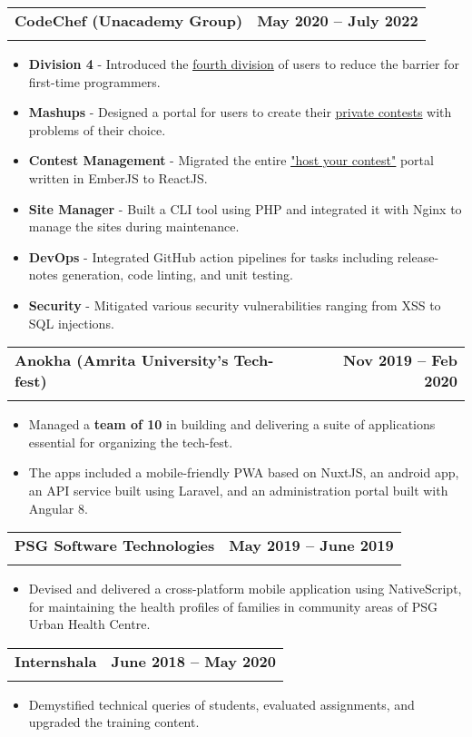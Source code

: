 \documentclass[letterpaper,11pt]{article}
\makeatletter
\newcommand{\resumeItem}[1]{
  \item\small{
    {#1 \vspace{-2pt}}
  }
}
\newcommand{\resumeSubheading}[4]{
  \vspace{-2pt}\item
    \begin{tabular*}{1.0\textwidth}[t]{l@{\extracolsep{\fill}}r}
      \textbf{#1} & \textbf{\small #2} \\
      \text{\small#3} & \text{\small #4} \\
    \end{tabular*}\vspace{-7pt}
}
\newcommand{\resumeItemListStart}{\begin{itemize}}
\newcommand{\resumeItemListEnd}{\end{itemize}\vspace{-5pt}}
\makeatother
\begin{document}
    \resumeSubheading
      {CodeChef (Unacademy Group)}{May 2020 -- July 2022}
      {Application Engineer $|$ Prev. Intern $|$ Tech : PHP,  Python,  ReactJS,  MySQL, SaltStack, AWS}{Bangalore, India}
      \resumeItemListStart
        \resumeItem{\textbf{Division 4} - Introduced the \href{https://blog.codechef.com/2022/02/11/rated-contests-for-coders-with-no-dsa-knowledge-smells-like-div-4/}{\underline{fourth division}} of users to reduce the barrier for first-time programmers.}
        \resumeItem{\textbf{Mashups} - Designed a portal for users to create their \href{https://www.codechef.com/mashup-contest}{\underline{private contests}} with problems of their choice.}        
        \resumeItem{\textbf{Contest Management} - Migrated the entire \href{https://www.codechef.com/hostyourcontest/}{\underline{"host your contest"}} portal written in EmberJS to ReactJS.}
              \resumeItem{\textbf{Site Manager} - Built a CLI tool using PHP and integrated it with Nginx to manage the sites during maintenance.}
              \resumeItem{\textbf{DevOps} - Integrated GitHub action pipelines for tasks including release-notes generation, code linting, and unit testing.}
              \resumeItem{\textbf{Security} - Mitigated various security vulnerabilities ranging from XSS to SQL injections.}
      \resumeItemListEnd
    
    \resumeSubheading
      {Anokha (Amrita University's Tech-fest)}{Nov 2019 -- Feb 2020}
      {Head of the Software Team $|$ Tech: Laravel,  MySQL,  NuxtJS,  Angular8,  CentOS}{Coimbatore, India}
      \resumeItemListStart
        \resumeItem{Managed a \textbf{team of 10} in building and delivering a suite of applications essential for organizing the tech-fest.}
        \resumeItem{The apps included a mobile-friendly PWA based on NuxtJS,  an android app,  an API service built using Laravel,  and an administration portal built with Angular 8.}
    \resumeItemListEnd    
    
    \resumeSubheading
      {PSG Software Technologies}{May 2019 -- June 2019}
      {Mobile App Developer Intern $|$ Tech : NodeJS,  NativeScript}{Coimbatore, India}
      \resumeItemListStart
        \resumeItem{Devised and delivered a cross-platform mobile application using NativeScript,  for maintaining the health profiles of families in community areas of PSG Urban Health Centre.}
    \resumeItemListEnd

    \resumeSubheading
      {Internshala}{June 2018 -- May 2020}
      {Teaching Assistant $|$ Tech: C, C++}{Remote}
      \resumeItemListStart
        \resumeItem{Demystified technical queries of students,  evaluated assignments, and upgraded the training content.}
    \resumeItemListEnd
    
\end{document}
